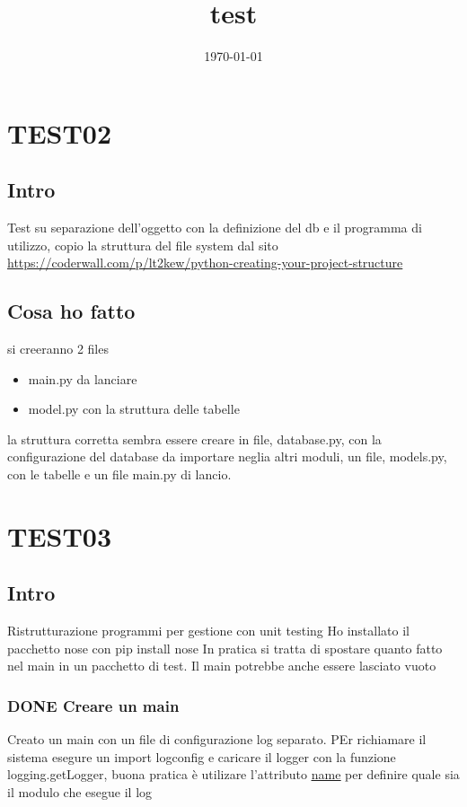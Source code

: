 \documentclass[11pt]{article}
\date{\today}
\title{test}
\begin{document}
\maketitle
\tableofcontents

\section{TEST02}
\label{sec-1}
\subsection{Intro}
\label{sec-1-1}
Test su separazione dell'oggetto con la definizione del db e il programma di
utilizzo, copio la struttura del file system dal sito
\url{https://coderwall.com/p/lt2kew/python-creating-your-project-structure}

\subsection{Cosa ho fatto}
\label{sec-1-2}
si creeranno 2 files
\begin{itemize}
\item main.py da lanciare
\item model.py con la struttura delle tabelle
\end{itemize}

la struttura corretta sembra essere creare in file, database.py, con
la configurazione del database da importare neglia altri moduli,
un file, models.py, con le tabelle e un file main.py di lancio.

\section{TEST03}
\label{sec-2}
\subsection{Intro}
\label{sec-2-1}
Ristrutturazione programmi per gestione con unit testing
Ho installato il pacchetto nose con pip install nose
In pratica si tratta di spostare quanto fatto nel main in un pacchetto
di test. Il main potrebbe anche essere lasciato vuoto

\subsubsection{{\bfseries\sffamily DONE} Creare un main}
\label{sec-2-1-1}
Creato un main con un file di configurazione log separato.
PEr richiamare il sistema esegure un import logconfig e caricare il logger con la funzione logging.getLogger, buona pratica è utilizare l'attributo 
\uline{\uline{name}} per definire quale sia il modulo che esegue il log
\end{document}
